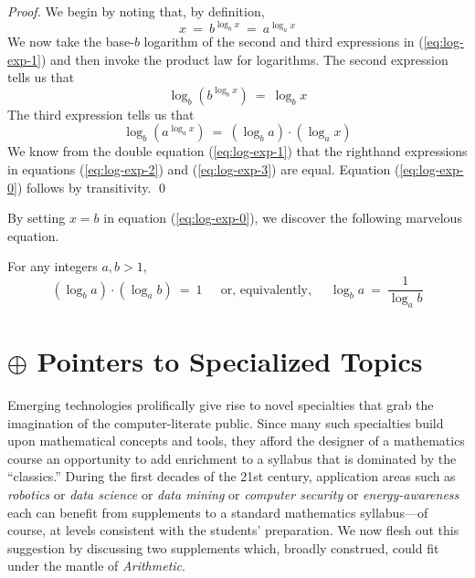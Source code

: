 \begin{proof}
We begin by noting that, by definition,
\begin{equation}
\label{eq:log-exp-1}
 x \ = \ b^{\log_b x} \ = \ a^{\log_a x}
\end{equation}
We now take the base-$b$ logarithm of the second and third expressions in (\ref{eq:log-exp-1}) and then invoke the product law for logarithms.  The second expression tells us that
\begin{equation}
\label{eq:log-exp-2}
 \log_b \left(b^{\log_b x} \right) \ = \ \log_b x
\end{equation}
The third expression tells us that
\begin{equation}
\label{eq:log-exp-3}
 \log_b \left( a^{\log_a x} \right) \ = \
\left(\log_b a \right) \cdot \left( \log_a x \right)
\end{equation}
We know from the double equation (\ref{eq:log-exp-1}) that the righthand expressions in equations (\ref{eq:log-exp-2}) and (\ref{eq:log-exp-3}) are equal.  Equation (\ref{eq:log-exp-0}) follows by transitivity.  \qed
\end{proof}

\noindent
By setting $x = b$ in equation (\ref{eq:log-exp-0}), we discover the following marvelous equation.

\begin{prop}
For any integers $a, b >1$,
\begin{equation}
\left(\log_b a \right) \cdot \left( \log_a b \right) \ = \ 1 \ \ \ \ \
\mbox{ or, equivalently, } \ \ \ \ \
\log_b a \ = \ \frac{1}{\log_a b} 
\end{equation}
\end{prop}


\section{$\oplus$ Pointers to Specialized Topics}

Emerging technologies prolifically give rise to novel specialties that grab the imagination of the computer-literate public.  Since many such specialties build upon mathematical concepts and tools, they afford the designer of a mathematics course an opportunity to add enrichment to a syllabus that is dominated by the ``classics.''  During the first decades of the 21st century, application areas such as {\it robotics} or {\it data science} or {\it data mining} or {\it computer security} or {\it energy-awareness} each can benefit from supplements to a standard mathematics syllabus---of course, at levels consistent with the students' preparation.  We now flesh out this suggestion by discussing two supplements which, broadly construed, could fit under the mantle of {\it Arithmetic}.

